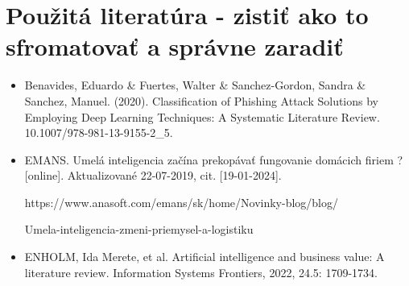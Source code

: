 \section{\textbf{Použitá literatúra - zistiť ako to sfromatovať a správne zaradiť }}

\begin{itemize}
    \item Benavides, Eduardo \& Fuertes, Walter \& Sanchez-Gordon, Sandra \& Sanchez, Manuel. (2020). Classification of Phishing Attack Solutions by Employing Deep Learning Techniques: A Systematic Literature Review. 10.1007/978-981-13-9155-2\_5.
  
    \item EMANS. Umelá inteligencia začína prekopávať fungovanie domácich firiem ?  [online]. Aktualizované  22-07-2019, cit. [19-01-2024].  
    \par https://www.anasoft.com/emans/sk/home/Novinky-blog/blog/ \par Umela-inteligencia-zmeni-priemysel-a-logistiku
   
    \item ENHOLM, Ida Merete, et al. Artificial intelligence and business value: A literature review. Information Systems Frontiers, 2022, 24.5: 1709-1734.
   

\end{itemize}
